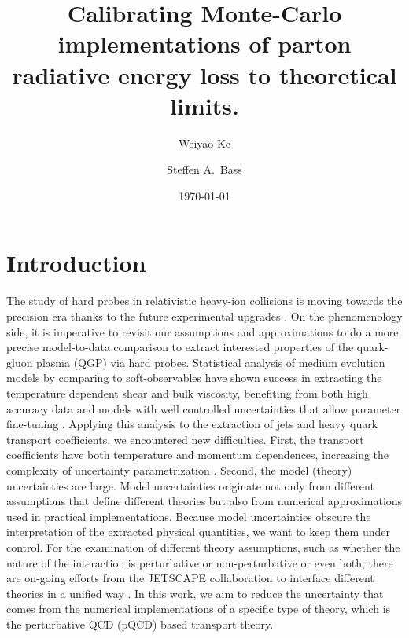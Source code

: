\documentclass[aps, prc, reprint, amsmath, groupedaddress, nofootinbib]{revtex4-1}
\begin{document}
\title{Calibrating Monte-Carlo implementations of parton radiative energy loss to theoretical limits.}
\author{Weiyao Ke}
\author{Steffen A.\ Bass}
\date{\today}
\maketitle 

\section{Introduction}
The study of hard probes in relativistic heavy-ion collisions is moving towards the precision era thanks to the future experimental upgrades \cite{ATLAS-Collaboration:2012iwa,Abelevetal:2014dna,STAR:upgrade-hf,Adare:2015kwa,CMS:2017dec}.
On the phenomenology side, it is imperative to revisit our assumptions and approximations to do a more precise model-to-data comparison to extract interested properties of the quark-gluon plasma (QGP) via hard probes.
Statistical analysis of medium evolution models by comparing to soft-observables have shown success in extracting the temperature dependent shear and bulk viscosity, benefiting from both high accuracy data and models with well controlled uncertainties that allow parameter fine-tuning \cite{Bernhard:2016tnd, Bernhard:2018hnz}.
Applying this analysis to the extraction of jets and heavy quark transport coefficients, we encountered new difficulties. 
First, the transport coefficients have both temperature and momentum dependences, increasing the complexity of uncertainty parametrization \cite{Xu:2017obm}.
Second, the model (theory) uncertainties are large. 
Model uncertainties originate not only from different assumptions that define different theories \cite{CaronHuot:2010bp, Rapp:2018qla} but also from numerical approximations used in practical implementations.
Because model uncertainties obscure the interpretation of the extracted physical quantities, we want to keep them under control.
For the examination of different theory assumptions, such as whether the nature of the interaction is perturbative or non-perturbative or even both, there are on-going efforts from the JETSCAPE collaboration to interface different theories in a unified way \cite{Cao:2017zih, Kauder:2018cdt}.
In this work, we aim to reduce the uncertainty that comes from the numerical implementations of a specific type of theory, which is the perturbative QCD (pQCD) based transport theory.
\end{document}
